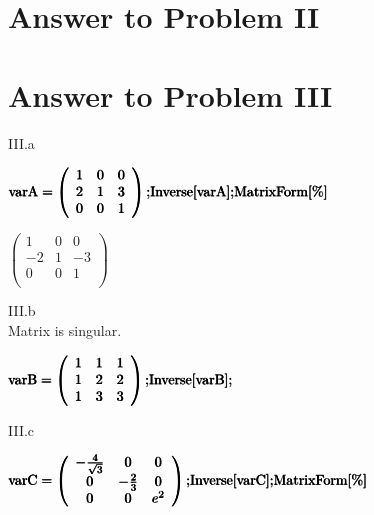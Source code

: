 \documentclass[11pt,a4paper]{article}
\begin{document}
\section{Answer to Problem II}\label{sec:P02}



\clearpage
\section{Answer to Problem III}\label{sec:P03} %

\hfill \break
III.a\\
\begin{doublespace}
\noindent\(\pmb{\text{varA}=\left(
\begin{array}{ccc}
 1 & 0 & 0 \\
 2 & 1 & 3 \\
 0 & 0 & 1 \\
\end{array}
\right);}\\
\pmb{\text{Inverse}[\text{varA}];}\\
\pmb{\text{MatrixForm}[\%]}\)
\end{doublespace}

\begin{doublespace}
\noindent\(\left(
\begin{array}{ccc}
 1 & 0 & 0 \\
 -2 & 1 & -3 \\
 0 & 0 & 1 \\
\end{array}
\right)\)
\end{doublespace}

\hfill \break
III.b\\
Matrix is singular.

\begin{doublespace}
\noindent\(\pmb{\text{varB}=\left(
\begin{array}{ccc}
 1 & 1 & 1 \\
 1 & 2 & 2 \\
 1 & 3 & 3 \\
\end{array}
\right);}\\
\pmb{\text{Inverse}[\text{varB}];}\)
\end{doublespace}

\hfill \break
III.c\\
\begin{doublespace}
\noindent\(\pmb{\text{varC}=\left(
\begin{array}{ccc}
 -\frac{4}{\sqrt{3}} & 0 & 0 \\
 0 & -\frac{2}{3} & 0 \\
 0 & 0 & e^2 \\
\end{array}
\right);}\\
\pmb{\text{Inverse}[\text{varC}];}\\
\pmb{\text{MatrixForm}[\%]}\)
\end{doublespace}
\end{document}
